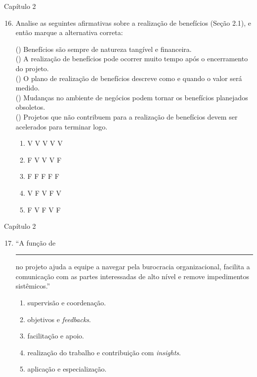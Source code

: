 \documentclass{beamer}
\begin{document}
\begin{frame}{Capítulo 2}
	\begin{enumerate}
		\setcounter{enumi}{15}
		\justifying
		\item Analise as seguintes afirmativas sobre a realização de benefícios (Seção 2.1), e então marque a alternativa correta:
		
		\vspace{10pt} \footnotesize
		(\hspace{10pt}) Benefícios são sempre de natureza tangível e financeira.\\
		(\hspace{10pt}) A realização de benefícios pode ocorrer muito tempo após o encerramento do projeto.\\
		(\hspace{10pt}) O plano de realização de benefícios descreve como e quando o valor será medido.\\
		(\hspace{10pt}) Mudanças no ambiente de negócios podem tornar os benefícios planejados obsoletos.\\
		(\hspace{10pt}) Projetos que não contribuem para a realização de benefícios devem ser acelerados para terminar logo.
		
		\vspace{10pt} \normalsize
		\begin{enumerate}[a]
			\justifying
			\item V V V V V
			\item \alert<2>{F V V V F}
			\item F F F F F
			\item V F V F V
			\item F V F V F
		\end{enumerate}
	\end{enumerate}
\end{frame}

\begin{frame}{Capítulo 2}
	\begin{enumerate}
		\setcounter{enumi}{16}
		\justifying
		\item ``A função de \rule{50pt}{0.7pt} no projeto ajuda a equipe a navegar pela burocracia organizacional, facilita a comunicação com as partes interessadas de alto nível e remove impedimentos sistêmicos.''
		\begin{enumerate}[a]
			\item supervisão e coordenação.
			\item objetivos e \textit{feedbacks}.
			\item \alert<2>{facilitação e apoio}.
			\item realização do trabalho e contribuição com \textit{insights}.
			\item aplicação e especialização.
		\end{enumerate}
	\end{enumerate}
\end{frame}
\end{document}
